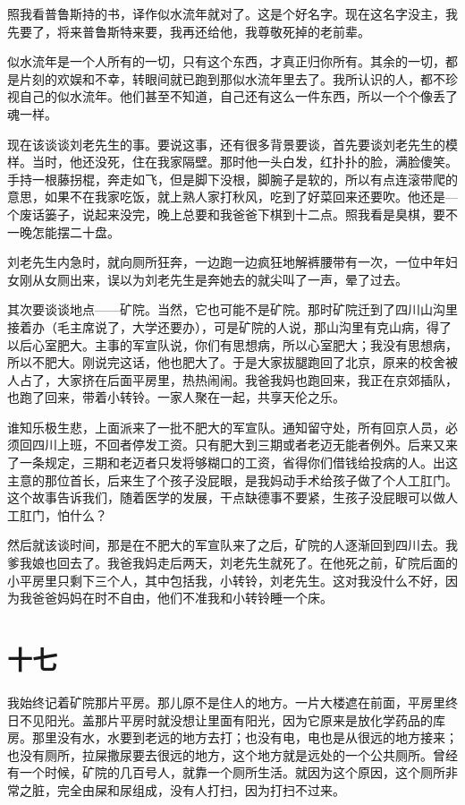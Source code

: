 照我看普鲁斯持的书，译作似水流年就对了。这是个好名字。现在这名字没主，我先要了，将来普鲁斯特来要，我再还给他，我尊敬死掉的老前辈。 

似水流年是一个人所有的一切，只有这个东西，才真正归你所有。其余的一切，都是片刻的欢娱和不幸，转眼间就已跑到那似水流年里去了。我所认识的人，都不珍视自己的似水流年。他们甚至不知道，自己还有这么一件东西，所以一个个像丢了魂一样。 

现在该谈谈刘老先生的事。要说这事，还有很多背景要谈，首先要谈刘老先生的模样。当时，他还没死，住在我家隔壁。那时他一头白发，红扑扑的脸，满脸傻笑。手持一根藤拐棍，奔走如飞，但是脚下没根，脚腕子是软的，所以有点连滚带爬的意思，如果不在我家吃饭，就上熟人家打秋风，吃到了好菜回来还要吹。他还是—个废话篓子，说起来没完，晚上总要和我爸爸下棋到十二点。照我看是臭棋，要不一晚怎能摆二十盘。 


刘老先生内急时，就向厕所狂奔，一边跑一边疯狂地解裤腰带有一次，一位中年妇女刚从女厕出来，误以为刘老先生是奔她去的就尖叫了一声，晕了过去。 

其次要谈谈地点——矿院。当然，它也可能不是矿院。那时矿院迁到了四川山沟里接着办（毛主席说了，大学还要办），可是矿院的人说，那山沟里有克山病，得了以后心室肥大。主事的军宣队说，你们有思想病，所以心室肥大；我没有思想病，所以不肥大。刚说完这话，他也肥大了。于是大家拔腿跑回了北京，原来的校舍被人占了，大家挤在后面平房里，热热闹闹。我爸我妈也跑回来，我正在京郊插队，也跑了回来，带着小转铃。一家人聚在一起，共享天伦之乐。 

谁知乐极生悲，上面派来了一批不肥大的军宣队。通知留守处，所有回京人员，必须回四川上班，不回者停发工资。只有肥大到三期或者老迈无能者例外。后来又来了一条规定，三期和老迈者只发将够糊口的工资，省得你们借钱给投病的人。出这主意的那位首长，后来生了个孩子没屁眼，是我妈动手术给孩子做了个人工肛门。这个故事告诉我们，随着医学的发展，干点缺德事不要紧，生孩子没屁眼可以做人工肛门，怕什么？ 

然后就该谈时间，那是在不肥大的军宣队来了之后，矿院的人逐渐回到四川去。我爹我娘也回去了。我爸我妈走后两天，刘老先生就死了。在他死之前，矿院后面的小平房里只剩下三个人，其中包括我，小转铃，刘老先生。这对我没什么不好，因为我爸爸妈妈在时不自由，他们不准我和小转铃睡一个床。

\section{十七}

我始终记着矿院那片平房。那儿原不是住人的地方。一片大楼遮在前面，平房里终日不见阳光。盖那片平房时就没想让里面有阳光，因为它原来是放化学药品的库房。那里没有水，水要到老远的地方去打；也没有电，电也是从很远的地方接来；也没有厕所，拉屎撒尿要去很远的地方，这个地方就是远处的一个公共厕所。曾经有一个时候，矿院的几百号人，就靠一个厕所生活。就因为这个原因，这个厕所非常之脏，完全由屎和尿组成，没有人打扫，因为打扫不过来。 


